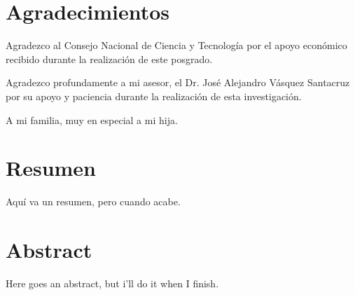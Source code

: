\chapter*{Agradecimientos} 

Agradezco al Consejo Nacional de Ciencia y Tecnología por el apoyo económico recibido durante la realización de este posgrado.

Agradezco profundamente a mi asesor, el Dr. José Alejandro Vásquez Santacruz por su apoyo y paciencia durante la realización de esta investigación.

A mi familia, muy en especial a mi hija. 

\chapter*{Resumen}

Aquí va un resumen, pero cuando acabe.

\chapter*{Abstract}

Here goes an abstract, but i'll do it when I finish.

